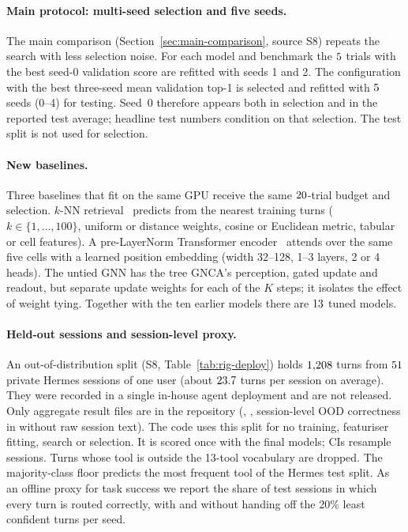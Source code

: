 \documentclass[10pt,twocolumn,letterpaper]{article}
\begin{document}
\paragraph{Main protocol: multi-seed selection and five seeds.} The main comparison (Section~\ref{sec:main-comparison}, source S8) repeats the search with less selection noise. For each model and benchmark the $5$ trials with the best seed-0 validation score are refitted with seeds 1 and 2. The configuration with the best three-seed mean validation top-1 is selected and refitted with $5$ seeds (0--4) for testing. Seed~0 therefore appears both in selection and in the reported test average; headline test numbers condition on that selection. The test split is not used for selection.
\paragraph{New baselines.} Three baselines that fit on the same GPU receive the same $20$-trial budget and selection. $k$-NN retrieval~\cite{cover1967nearest} predicts from the nearest training turns ($k\in\{1,\dots,100\}$, uniform or distance weights, cosine or Euclidean metric, tabular or cell features). A pre-LayerNorm Transformer encoder~\cite{vaswani2017attention} attends over the same five cells with a learned position embedding (width 32--128, 1--3 layers, 2 or 4 heads). The untied GNN has the tree GNCA's perception, gated update and readout, but separate update weights for each of the $K$ steps; it isolates the effect of weight tying. Together with the ten earlier models there are $13$ tuned models.
\paragraph{Held-out sessions and session-level proxy.} An out-of-distribution split (S8, Table~\ref{tab:rig-deploy}) holds $1{,}208$ turns from $51$ private Hermes sessions of one user (about $23.7$ turns per session on average). They were recorded in a single in-house agent deployment and are not released. Only aggregate result files are in the repository (\pathOodStats{}, \pathOodSummary{}, session-level OOD correctness in \pathOodPerTurn{} without raw session text). The code uses this split for no training, featuriser fitting, search or selection. It is scored once with the final models; CIs resample sessions. Turns whose tool is outside the 13-tool vocabulary are dropped. The majority-class floor predicts the most frequent tool of the Hermes test split. As an offline proxy for task success we report the share of test sessions in which every turn is routed correctly, with and without handing off the 20\% least confident turns per seed.
\end{document}
